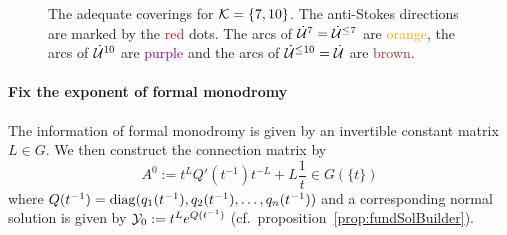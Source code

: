 \begin{figure}
  \caption{The adequate coverings for $\mathcal{K}=\{7,10\}$.
    The anti-Stokes directions are marked by the \textcolor{red}{red} dots.
    The arcs of $\dot{\mathcal{U}}^{7}=\dot{\mathcal{U}}^{\leq7}$ are
    \textcolor{orange}{orange}, the arcs of $\dot{\mathcal{U}}^{10}$ are
    \textcolor{purple}{purple} and the arcs of $\dot{\mathcal{U}}^{\leq10}=\dot{\mathcal{U}}$
    are \textcolor{brown}{brown}.
  }\label{fig:adequateCovering}
\end{figure}%

\paragraph{Fix the exponent of formal monodromy}
The information of formal monodromy is given by an invertible constant matrix
$L\in G$.
We then construct the connection matrix by
\[
  A^0:=t^LQ'(t^{-1})t^{-L}+L\frac{1}{t} \in G(\!\{t\}\!)
\]
where $Q(t^{-1})=\operatorname{diag}(q_1(t^{-1}),q_2(t^{-1}),\dots,q_n(t^{-1}))$ and
a corresponding normal solution is given by $\mathcal{Y}_0:=t^Le^{Q(t^{-1})}$
(cf.\ proposition~\ref{prop:fundSolBuilder}).
\begin{comment}
  If we assume that $L$ is diagonal, we can use the commutation of diagonal
  matrices to write $A^0:=Q'(t^{-1})+L\frac{1}{t}$.
\end{comment}

